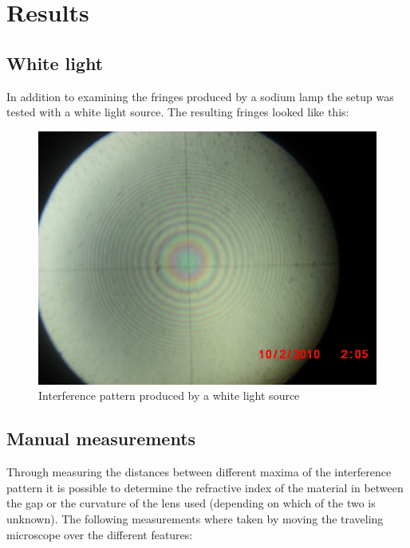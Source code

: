 \documentclass[12pt]{article}
\begin{document}
\section{Results}

\subsection{White light}

In addition to examining the fringes produced by a sodium lamp the setup
was tested with a white light source. The resulting fringes looked like this:

\begin{figure}[H]
  \centering
  \includegraphics[width=12cm]{./images/white_light.JPG}
  \caption{Interference pattern produced by a white light source}
  \label{fig:white_light}
\end{figure}

\subsection{Manual measurements}
Through measuring the distances between different maxima of the interference pattern
it is possible to determine the refractive index of the material in between the gap
or the curvature of the lens used (depending on which of the two is unknown).
The following measurements where taken by moving the traveling microscope over the different features:
\end{document}
